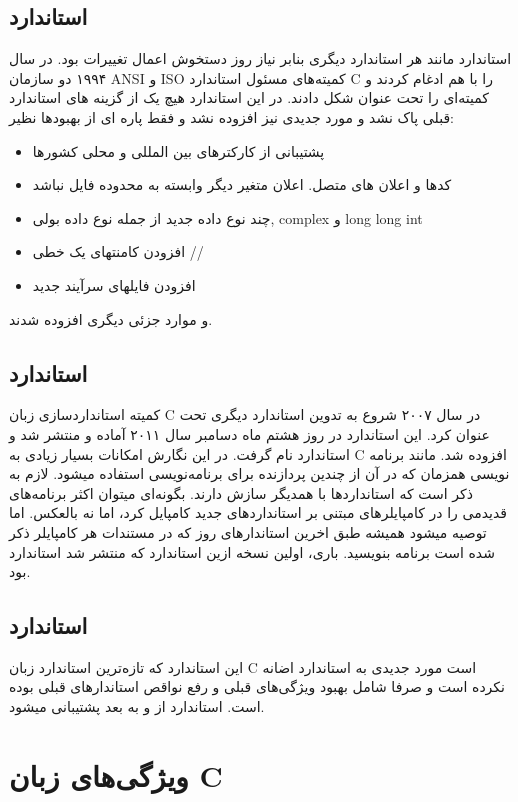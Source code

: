 \subsection{استاندارد }
استاندارد  مانند هر استاندارد دیگری بنابر نیاز روز دستخوش اعمال تغییرات بود. در سال ۱۹۹۴ دو سازمان ANSI و ISO کمیته‌های مسئول استاندارد C را با هم ادغام کردند و کمیته‌ای را تحت عنوان  شکل دادند. در این استاندارد هیچ یک از گزینه های استاندارد قبلی پاک نشد و مورد جدیدی نیز افزوده نشد و فقط پاره ای از بهبودها نظیر:
\begin{itemize}
	\item پشتیبانی از کارکترهای بین المللی و محلی کشورها
	\item کدها و اعلان های متصل. اعلان متغیر دیگر وابسته به محدوده فایل نباشد
	\item چند نوع داده جدید از جمله نوع داده بولی, complex و long long int
	\item افزودن کامنتهای یک خطی //
	\item افزودن فایلهای سرآیند جدید
\end{itemize}
و موارد جزئی دیگری افزوده شدند.
\subsection{استاندارد }
کمیته استانداردسازی زبان C در سال ۲۰۰۷ شروع به تدوین استاندارد دیگری تحت عنوان  کرد. این استاندارد در روز هشتم ماه دسامبر سال ۲۰۱۱ آماده و منتشر شد و استاندارد  نام گرفت. در این نگارش امکانات بسیار زیادی به C افزوده شد. مانند برنامه نویسی همزمان که در آن از چندین پردازنده برای برنامه‌نویسی استفاده میشود.  لازم به ذکر است که استانداردها با همدیگر سازش دارند. بگونه‌ای میتوان اکثر برنامه‌های قدیدمی را در کامپایلرهای مبتنی بر استانداردهای جدید کامپایل کرد، اما نه بالعکس. اما توصیه میشود همیشه طبق اخرین استاندارهای روز که در مستندات هر کامپایلر ذکر شده است برنامه بنویسید. باری، اولین نسخه ازین استاندارد که منتشر شد استاندارد  بود.
\subsection{استاندارد }
این استاندارد که تازه‌ترین استاندارد زبان C است مورد جدیدی به استاندارد  اضانه نکرده است و صرفا شامل بهبود ویژگی‌های قبلی و رفع نواقص استاندارهای قبلی بوده است. استاندارد  از  و  به بعد پشتیبانی میشود.
\section{ویژگی‌های زبان C}
